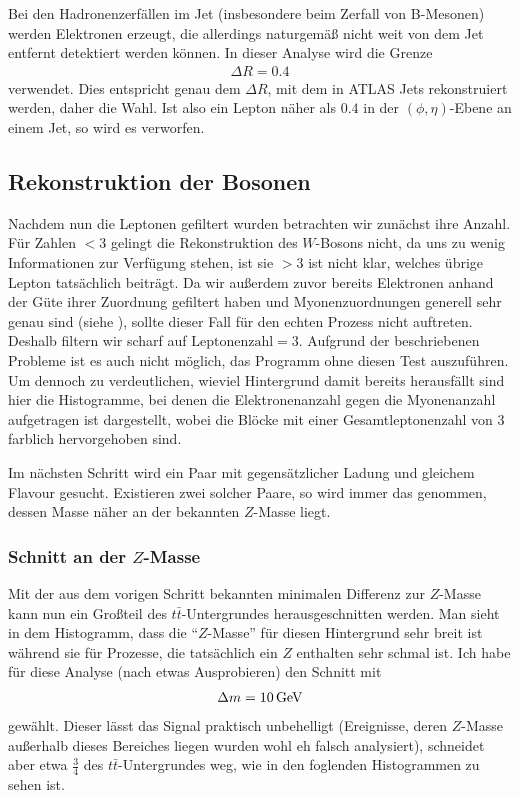 Bei den Hadronenzerfällen im Jet (insbesondere beim Zerfall von B-Mesonen)
werden Elektronen erzeugt, die allerdings naturgemäß nicht weit von dem Jet
entfernt detektiert werden können. In dieser Analyse wird die Grenze
\begin{align}
  \Delta R = 0.4
\end{align}
verwendet. Dies entspricht genau dem $\Delta R$, mit dem in ATLAS Jets
rekonstruiert werden\cite{jet-recon}, daher die Wahl. Ist also ein Lepton näher
als $0.4$ in der $(\phi, \eta)$-Ebene an einem Jet, so wird es verworfen.


\subsection{Rekonstruktion der Bosonen}
Nachdem nun die Leptonen gefiltert wurden betrachten wir zunächst ihre Anzahl.
Für Zahlen $< 3$ gelingt die Rekonstruktion des $W$-Bosons nicht, da uns zu
wenig Informationen zur Verfügung stehen, ist sie $> 3$ ist nicht klar, welches
übrige Lepton tatsächlich beiträgt. Da wir außerdem zuvor bereits Elektronen
anhand der Güte ihrer Zuordnung gefiltert haben und Myonenzuordnungen generell
sehr genau sind (siehe \cite{myon-zuordnung}), sollte dieser Fall für den echten
Prozess nicht auftreten. Deshalb filtern wir scharf auf $\text{Leptonenzahl} =
3$. Aufgrund der beschriebenen Probleme ist es auch nicht möglich, das Programm
ohne diesen Test auszuführen. Um dennoch zu verdeutlichen, wieviel Hintergrund
damit bereits herausfällt sind hier die Histogramme, bei denen die
Elektronenanzahl gegen die Myonenanzahl aufgetragen ist dargestellt, wobei die
Blöcke mit einer Gesamtleptonenzahl von 3 farblich hervorgehoben sind.

Im nächsten Schritt wird ein Paar mit gegensätzlicher Ladung und gleichem
Flavour gesucht. Existieren zwei solcher Paare, so wird immer das genommen,
dessen Masse näher an der bekannten $Z$-Masse liegt.


\subsubsection{Schnitt an der $Z$-Masse}
Mit der aus dem vorigen Schritt bekannten minimalen Differenz zur $Z$-Masse kann
nun ein Großteil des $t\bar{t}$-Untergrundes herausgeschnitten werden. Man sieht
in dem Histogramm, dass die "`$Z$-Masse"' für diesen Hintergrund sehr breit ist
während sie für Prozesse, die tatsächlich ein $Z$ enthalten sehr schmal ist. Ich
habe für diese Analyse (nach etwas Ausprobieren) den Schnitt mit
\begin{align}
  \Delta m = \unit[10]{GeV}
\end{align}
gewählt. Dieser lässt das Signal praktisch unbehelligt (Ereignisse, deren
$Z$-Masse außerhalb dieses Bereiches liegen wurden wohl eh falsch analysiert),
schneidet aber etwa $\frac{3}{4}$ des $t\bar{t}$-Untergrundes weg, wie in den
foglenden Histogrammen zu sehen ist.
